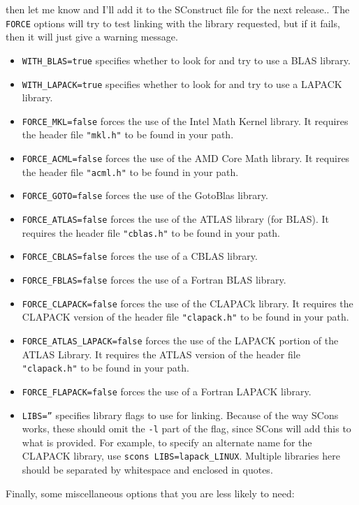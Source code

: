 \documentclass[twoside,letterpaper,11pt]{article}
\begin{document}
\begin{enumerate}
{then let me know and I'll add it to the SConstruct file for the next release.}.
The \texttt{FORCE} options will try to test linking with the library requested,
but if it fails, then it will just give a warning message.
\begin{itemize}
\item \texttt{WITH\_BLAS=true} specifies whether to look for and try to use a BLAS library.
\item \texttt{WITH\_LAPACK=true} specifies whether to look for and try to use a LAPACK library.
\item \texttt{FORCE\_MKL=false} forces the use of the Intel Math Kernel library. 
It requires the header file \texttt{"mkl.h"} to be found in your path. 
\item \texttt{FORCE\_ACML=false} forces the use of the AMD Core Math library.  
It requires the header file \texttt{"acml.h"} to be found in your path.
\item \texttt{FORCE\_GOTO=false} forces the use of the GotoBlas library.  
\item \texttt{FORCE\_ATLAS=false} forces the use of the ATLAS library (for BLAS).  
It requires the header file \texttt{"cblas.h"} to be found in your path.
\item \texttt{FORCE\_CBLAS=false} forces the use of a CBLAS library.
\item \texttt{FORCE\_FBLAS=false} forces the use of a Fortran BLAS library.
\item \texttt{FORCE\_CLAPACK=false} forces the use of the CLAPACk library. 
It requires the CLAPACK version of the header file \texttt{"clapack.h"} to be found in your path.
\item \texttt{FORCE\_ATLAS\_LAPACK=false} forces the use of the LAPACK portion
of the ATLAS Library.  
It requires the ATLAS version of the header file \texttt{"clapack.h"} to be found in your path.
\item \texttt{FORCE\_FLAPACK=false} forces the use of a Fortran LAPACK library.
\item \texttt{LIBS=''} specifies library flags to use for linking.  Because of the way SCons works,
these should omit the \texttt{-l} part of the flag, since SCons will add this to what is provided.
For example, to specify an alternate name for the CLAPACK library, use 
\texttt{scons LIBS=lapack\_LINUX}.  Multiple libraries here should be separated by 
whitespace and enclosed in quotes.
\end{itemize}
Finally, some miscellaneous options that you are less likely to need:

\end{enumerate}
\end{document}

